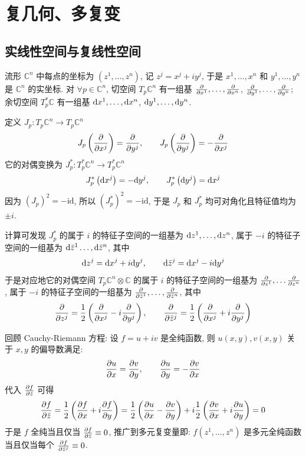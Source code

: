 \chapter{复几何、多复变}
    \section{实线性空间与复线性空间}
        流形 $\mathbb{C}^n$ 中每点的坐标为 $(z^1,\dots,z^n)$, 记 $z^j=x^j+iy^j$, 于是 $x^1,\dots,x^n$ 和 $y^1,\dots,y^n$ 是 $\mathbb{C}^n$ 的实坐标.
        对 $\forall p\in\mathbb{C}^n$, 切空间 $T_p\mathbb{C}^n$ 有一组基 $\frac{\partial }{\partial x^1},\dots,\frac{\partial }{\partial x^n}$, $\frac{\partial }{\partial y^1},\dots,\frac{\partial }{\partial y^n}$; 余切空间 $T^*_p\mathbb{C}$
        有一组基 ${\rm d} x^1,\dots,{\rm d} x^n$, ${\rm d} y^1,\dots,{\rm d} y^n$.

        定义 $J_p:T_p\mathbb{C}^n\rightarrow T_p\mathbb{C}^n$
        \begin{equation*}
            J_p\left(\frac{\partial }{\partial x^j}\right)=\frac{\partial }{\partial y^j},\qquad J_p\left(\frac{\partial }{\partial y^j}\right)=-\frac{\partial }{\partial x^j}
        \end{equation*}
        它的对偶变换为 $J^*_p:T^*_p\mathbb{C}^n\rightarrow T^*_p\mathbb{C}^n$
        \begin{equation*}
            J^*_p\left({\rm d} x^j\right)=-{\rm d}{y^j},\qquad J^*_p\left({\rm d}{y^j}\right)={\rm d}{x^j}
        \end{equation*}
        因为 $(J_p)^2=-\mathrm{id}$, 所以 $(J^*_p)^2=-\mathrm{id}$, 于是 $J_p$ 和 $J^*_p$ 均可对角化且特征值均为 $\pm i$.

        计算可发现 $J^*_p$ 的属于 $i$ 的特征子空间的一组基为 ${\rm d}{z^1},\dots,{\rm d}{z^n}$, 属于 $-i$ 的特征子空间的一组基为 ${\rm d}{\bar{z}^1}\dots,{\rm d}{\bar{z}^n}$, 其中
        \begin{equation*}
            {\rm d}{z^j}={\rm d}{x^j}+i{\rm d}{y^j},\qquad {\rm d}{\bar{z}^j}={\rm d}{x^j}-i{\rm d}{y^j}
        \end{equation*}
        于是对应地它的对偶空间 $T_p\mathbb{C}^n\otimes\mathbb{C}$ 的属于 $i$ 的特征子空间的一组基为 $\frac{\partial }{\partial z^1},\dots\frac{\partial }{\partial z^n}$, 属于 $-i$ 的特征子空间的一组基为 $\frac{\partial }{\partial \bar{z}^1},\dots,\frac{\partial }{\partial \bar{z}^n}$, 其中
        \begin{equation}\label{partialz&partialbarz}
            \frac{\partial }{\partial z^j}=\frac{1}{2}\left(\frac{\partial }{\partial x^j}-i\frac{\partial }{\partial y^j}\right),\qquad \frac{\partial }{\partial \bar{z}^j}=\frac{1}{2}\left(\frac{\partial }{\partial x^j}+i\frac{\partial }{\partial y^j}\right)
        \end{equation}
        
        回顾 Cauchy-Riemann 方程: 设 $f=u+iv$ 是全纯函数, 则 $u(x,y),v(x,y)$ 关于 $x,y$ 的偏导数满足:
        \begin{equation*}
            \frac{\partial u}{\partial x}=\frac{\partial v}{\partial y},\qquad \frac{\partial u}{\partial y}=-\frac{\partial v}{\partial x}
        \end{equation*}
        代入 $\frac{\partial f}{\partial \bar{z}}$ 可得
        \begin{equation*}
            \frac{\partial f}{\partial \bar{z}}=\frac{1}{2}\left(\frac{\partial f}{\partial x}+i\frac{\partial f}{\partial y}\right)=\frac{1}{2}\left(\frac{\partial u}{\partial x}-\frac{\partial v}{\partial y}\right)+i\frac{1}{2}\left(\frac{\partial v}{\partial x}+i\frac{\partial u}{\partial y}\right)=0
        \end{equation*}
        于是 $f$ 全纯当且仅当 $\frac{\partial f}{\partial \bar{z}}\equiv0$, 推广到多元复变量即: $f(z^1,\dots,z^n)$ 是多元全纯函数当且仅当每个 $\frac{\partial f}{\partial \bar{z}^j}\equiv0$.
    
